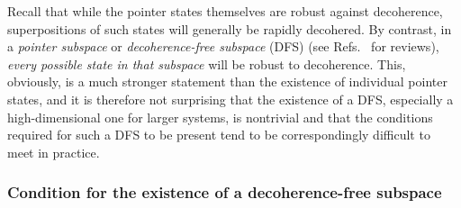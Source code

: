 \documentclass[3p,sort&compress]{elsarticle}
\begin{document}
Recall that while the pointer states themselves are robust against decoherence, superpositions of such states will generally be rapidly decohered. By contrast, in a \emph{pointer subspace} \cite{Zurek:1982:tv} or \emph{decoherence-free subspace} (DFS) \cite{Palma:1996:yy,Lidar:1998:uu,Zanardi:1997:yy,Zanardi:1997:tv,Zanardi:1998:oo,Lidar:1999:fa,Bacon:2000:yy,Duan:1998:yb,Zanardi:2001:oo,Knill:2000:aa} (see Refs.~\cite{Lidar:2003:aa,Lidar:2014:pp} for reviews), \emph{every possible state in that subspace} will be robust to decoherence. This, obviously, is a much stronger statement than the existence of individual pointer states, and it is therefore not surprising that the existence of a DFS, especially a high-dimensional one for larger systems, is nontrivial and that the conditions required for such a DFS to be present tend to be correspondingly difficult to meet in practice. 

\subsubsection{Condition for the existence of a decoherence-free subspace} 
\end{document}
